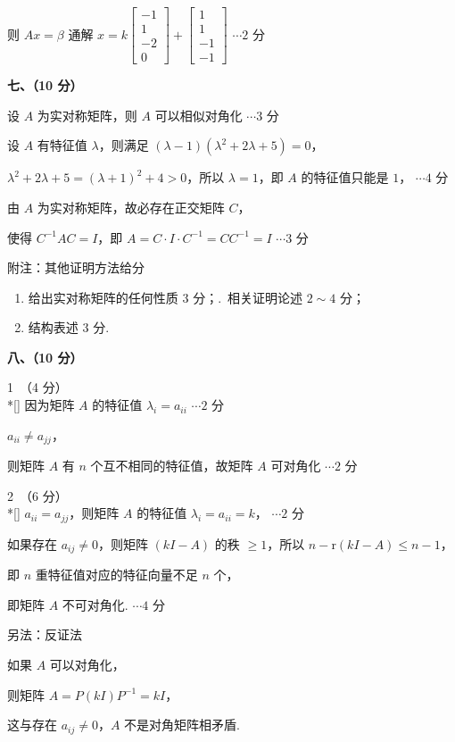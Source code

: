 \documentclass[a4paper,11pt]{ctexart}
\newcommand{\rk}{\mathrm{r}}
\newcommand{\score}[1]{\hfill$\cdots\text{#1 分}$}
\begin{document}
则 $Ax = \beta$ 通解 $x = k\begin{bmatrix} -1 \\ 1 \\ -2 \\ 0 \end{bmatrix} + \begin{bmatrix} 1 \\ 1 \\ -1 \\ -1 \end{bmatrix}$ \score{2}

\vspace{0.9em}

\textbf{七、（10 分）}

设 $A$ 为实对称矩阵，则 $A$ 可以相似对角化 \score{3}

设 $A$ 有特征值 $\lambda$，则满足 $(\lambda - 1)(\lambda^2 + 2\lambda + 5) = 0$，

$\lambda^2 + 2\lambda + 5 = (\lambda + 1)^2 + 4 > 0$，所以 $\lambda = 1$，即 $A$ 的特征值只能是 $1$， \score{4}

由 $A$ 为实对称矩阵，故必存在正交矩阵 $C$，

使得 $C^{-1}AC = I$，即 $A = C \cdot I \cdot C^{-1} = CC^{-1} = I$ \score{3}

附注：其他证明方法给分
\begin{enumerate}[label=\arabic*., leftmargin=2em, itemsep=0.15em, topsep=0.2em]
  \item 给出实对称矩阵的任何性质 $3$ 分；.\ 相关证明论述 $2\sim 4$ 分；
  \item[3.] 结构表述 $3$ 分.
\end{enumerate}

\newpage

\textbf{八、（10 分）}

1\ （4 分）\\*[\parskip]
因为矩阵 $A$ 的特征值 $\lambda_i = a_{ii}$ \score{2}

$a_{ii} \neq a_{jj}$，

则矩阵 $A$ 有 $n$ 个互不相同的特征值，故矩阵 $A$ 可对角化 \score{2}

\vspace{0.4em}
2\ （6 分）\\*[\parskip]
$a_{ii} = a_{jj}$，则矩阵 $A$ 的特征值 $\lambda_i = a_{ii} = k$， \score{2}

如果存在 $a_{ij} \neq 0$，则矩阵 $(kI - A)$ 的秩 $\ge 1$，所以 $n - \rk(kI - A) \le n - 1$，

即 $n$ 重特征值对应的特征向量不足 $n$ 个，

即矩阵 $A$ 不可对角化. \score{4}

\vspace{0.4em}
另法：反证法

如果 $A$ 可以对角化，

则矩阵 $A = P(kI)P^{-1} = kI$，

这与存在 $a_{ij} \neq 0$，$A$ 不是对角矩阵相矛盾.
\end{document}
